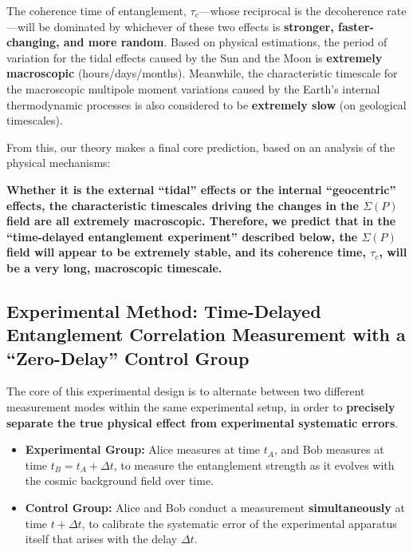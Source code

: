 \documentclass[11pt]{article}
\begin{document}
\noindent The coherence time of entanglement, $\tau_c$—whose reciprocal is the decoherence rate—will be dominated by whichever of these two effects is \textbf{stronger, faster-changing, and more random}.
Based on physical estimations, the period of variation for the tidal effects caused by the Sun and the Moon is \textbf{extremely macroscopic} (hours/days/months). Meanwhile, the characteristic timescale for the macroscopic multipole moment variations caused by the Earth's internal thermodynamic processes is also considered to be \textbf{extremely slow} (on geological timescales).

\vspace{1em} %
\noindent From this, our theory makes a final core prediction, based on an analysis of the physical mechanisms:

\begin{center}
    \textbf{Whether it is the external ``tidal'' effects or the internal ``geocentric'' effects, the characteristic timescales driving the changes in the $\Sigma(P)$ field are all extremely macroscopic. Therefore, we predict that in the ``time-delayed entanglement experiment'' described below, the $\Sigma(P)$ field will appear to be extremely stable, and its coherence time, $\tau_c$, will be a very long, macroscopic timescale.}
\end{center}


\subsection{Experimental Method: Time-Delayed Entanglement Correlation Measurement with a ``Zero-Delay'' Control Group}
The core of this experimental design is to alternate between two different measurement modes within the same experimental setup, in order to \textbf{precisely separate the true physical effect from experimental systematic errors}.
\begin{itemize}
    \item   \textbf{Experimental Group:} Alice measures at time $t_A$, and Bob measures at time $t_B = t_A + \Delta t$, to measure the entanglement strength as it evolves with the cosmic background field over time.
    \item   \textbf{Control Group:} Alice and Bob conduct a measurement \textbf{simultaneously} at time $t + \Delta t$, to calibrate the systematic error of the experimental apparatus itself that arises with the delay $\Delta t$.
\end{itemize}
\end{document}
